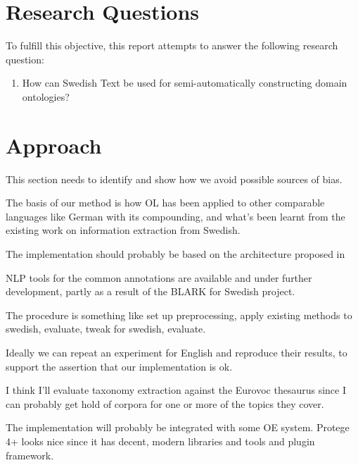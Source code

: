 \documentclass[a4paper]{report}
\begin{document}
\section{Research Questions}

To fulfill this objective, this report attempts to answer the following research question:

\begin{enumerate}
	\item How can Swedish Text be used for semi-automatically constructing domain ontologies?
\end{enumerate}

\section{Approach}

This section needs to identify and show how we avoid possible sources of bias.

The basis of our method is how OL has been applied to other comparable languages like German with its compounding, and what's been learnt from the existing work on information extraction from Swedish.

The implementation should probably be based on the architecture proposed in \cite{Cimiano2009OL}

NLP tools for the common annotations are available and under further development, partly as a result of the BLARK for Swedish project.

The procedure is something like set up preprocessing, apply existing methods to swedish, evaluate, tweak for swedish, evaluate.

Ideally we can repeat an experiment for English and reproduce their results, to support the assertion that our implementation is ok.

I think I'll evaluate taxonomy extraction against the Eurovoc thesaurus since I can probably get hold of corpora for one or more of the topics they cover.

The implementation will probably be integrated with some OE system.
Protege 4+ looks nice since it has decent, modern libraries and tools and plugin framework.



\end{document}
